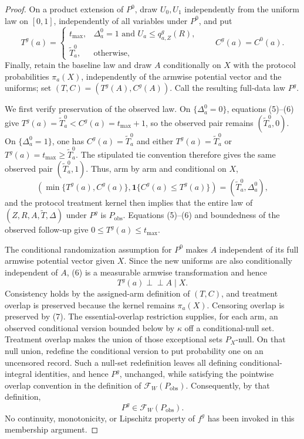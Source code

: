 \documentclass{article}
\begin{document}
\begin{proof}
On a product extension of \(P^0\), draw \(U_0,U_1\) independently from the uniform law on \([0,1]\), independently of all variables under \(P^0\), and put
\[
T^g(a)=
\begin{cases}
t_{\max},&\Delta_a^0=1\text{ and }U_a\le q^g_{a,Z}(R),\\
\widetilde T_a^0,&\text{otherwise},
\end{cases}
\qquad
C^g(a)=C^0(a).
\tag{6}
\]
Finally, retain the baseline law and draw \(A\) conditionally on \(X\) with the protocol probabilities \(\pi_a(X)\), independently of the armwise potential vector and the uniforms; set \((T,C)=(T^g(A),C^g(A))\).  Call the resulting full-data law \(P^g\).

We first verify preservation of the observed law.  On \(\{\Delta_a^0=0\}\), equations (5)--(6) give \(T^g(a)=\widetilde T_a^0<C^g(a)=t_{\max}+1\), so the observed pair remains \((\widetilde T_a^0,0)\).  On \(\{\Delta_a^0=1\}\), one has \(C^g(a)=\widetilde T_a^0\) and either \(T^g(a)=\widetilde T_a^0\) or \(T^g(a)=t_{\max}\ge\widetilde T_a^0\).  The stipulated tie convention therefore gives the same observed pair \((\widetilde T_a^0,1)\).  Thus, arm by arm and conditional on \(X\),
\[
\left(\min\{T^g(a),C^g(a)\},
\mathbf 1\{C^g(a)\le T^g(a)\}\right)
=(\widetilde T_a^0,\Delta_a^0),
\tag{7}
\]
and the protocol treatment kernel then implies that the entire law of \((Z,R,A,\widetilde T,\Delta)\) under \(P^g\) is \(P_{\mathrm{obs}}\).  Equations (5)--(6) and boundedness of the observed follow-up give \(0\le T^g(a)\le t_{\max}\).

The conditional randomization assumption for \(P^0\) makes \(A\) independent of its full armwise potential vector given \(X\).  Since the new uniforms are also conditionally independent of \(A\), (6) is a measurable armwise transformation and hence
\[
T^g(a)\perp\!\!\!\perp A\mid X.
\tag{8}
\]
Consistency holds by the assigned-arm definition of \((T,C)\), and treatment overlap is preserved because the kernel remains \(\pi_a(X)\).  Censoring overlap is preserved by (7).  The essential-overlap restriction supplies, for each arm, an observed conditional version bounded below by \(\kappa\) off a conditional-null set.  Treatment overlap makes the union of those exceptional sets \(P_X\)-null.  On that null union, redefine the conditional version to put probability one on an uncensored record.  Such a null-set redefinition leaves all defining conditional-integral identities, and hence \(P^g\), unchanged, while satisfying the pointwise overlap convention in the definition of \(\mathcal F_W(P_{\mathrm{obs}})\).  Consequently, by that definition,
\[
P^g\in\mathcal F_W(P_{\mathrm{obs}}).
\tag{9}
\]
No continuity, monotonicity, or Lipschitz property of \(f^g\) has been invoked in this membership argument.


\end{proof}
\end{document}
